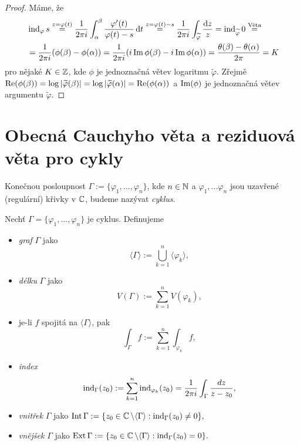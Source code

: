 \begin{proof}
Máme, že
\begin{equation*}
\begin{aligned}
&\operatorname{ind}_\varphi s\stackrel{z=\varphi(t)}{=}\frac{1}{2 \pi i}\int_\alpha^\beta \frac{\varphi'(t)}{\varphi(t)-s} \mathop{}\!\mathrm{d} t \stackrel{z=\varphi(t)-s}{=}
\frac{1}{2 \pi i} \int_{\widetilde{\varphi}} \frac{\mathop{}\!\mathrm{d} z}{z}=
\operatorname{ind}_{\widetilde{\varphi}}0\stackrel{\text{Věta}}{=}\\ &=  \frac{1}{2 \pi i}(\phi(\beta)-\phi(\alpha))=\frac{1}{2 \pi i}(i \operatorname{Im} \phi(\beta)-i \operatorname{Im} \phi(\alpha))=\frac{\theta(\beta)-\theta(\alpha)}{2 \pi}=K
\end{aligned}
\end{equation*}
pro nějaké $K \in \operatorname{\mathbb{Z}}$, kde $\phi$ je jednoznačná větev logaritmu $\widetilde{\varphi}$. Zřejmě $\operatorname{Re}(\phi(\beta)) =\log |\widetilde{\varphi}(\beta)|=\log |\widetilde{\varphi}(\alpha)|=\operatorname{Re}(\phi(\alpha)) $ a $\operatorname{Im}(\phi)$ je jednoznačná větev argumentu $\widetilde{\varphi}$.
\end{proof}

\section{Obecná Cauchyho věta a reziduová věta pro cykly}

\begin{definition}
Konečnou posloupnost $\Gamma:=\{\varphi_1, ... ,\varphi_n\}$, kde $n\in\operatorname{\mathbb{N}}$ a $\varphi_1, ... \varphi_n$ jsou uzavřené (regulární) křivky v $\operatorname{\mathbb{C}} $, budeme nazývat \emph{cyklus}.
\end{definition}

\begin{notation}
Nechť $\Gamma = \{\varphi_1, ... ,\varphi_n\}$ je cyklus. Definujeme
\begin{itemize}
    \item \emph{graf} $\Gamma$ jako $$\langle\Gamma\rangle:=\bigcup_{k=1}^n \langle\varphi_k\rangle,$$
    \item \emph{délku} $\Gamma$ jako $$V\left(\Gamma\right):=\sum_{k=1}^n V(\varphi_k),$$ 
    \item je-li $f$ spojitá na $\langle\Gamma\rangle$, pak $$\int_\Gamma f := \sum_{k=1}^n \int_{\varphi_k}f,$$
    \item \emph{index} $$\operatorname{ind}_\Gamma(z_0):=\sum_{k=1}^n \operatorname{ind}_{\varphi_k}(z_0) = \frac{1}{2\pi i}\int_\Gamma \frac{dz}{z-z_0},$$
    \item \emph{vnitřek} $\Gamma$ jako $\operatorname{Int}\Gamma:=\{z_0\in\operatorname{\mathbb{C}} \setminus\langle\Gamma\rangle: \operatorname{ind}_\Gamma(z_0)\neq 0\},$
    \item \emph{vnějšek} $\Gamma$ jako $\operatorname{Ext} \Gamma:=\{z_0\in\operatorname{\mathbb{C}} \setminus\langle\Gamma\rangle: \operatorname{ind}_\Gamma(z_0)=0\}.$
\end{itemize}
\end{notation}

